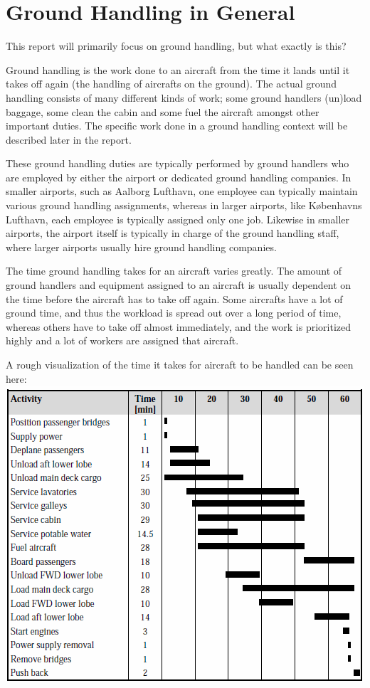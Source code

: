 \section{Ground Handling in General}
This report will primarily focus on ground handling, but what exactly is this?

Ground handling is the work done to an aircraft from the time it lands until it takes off again (the handling of aircrafts on the ground). The actual ground handling consists of many different kinds of work; some ground handlers (un)load baggage, some clean the cabin and some fuel the aircraft amongst other important duties. The specific work done in a ground handling context will be described later in the report.

These ground handling duties are typically performed by ground handlers who are employed by either the airport or dedicated ground handling companies. In smaller airports, such as Aalborg Lufthavn, one employee can typically maintain various ground handling assignments, whereas in larger airports, like Københavns Lufthavn, each employee is typically assigned only one job. Likewise in smaller airports, the airport itself is typically in charge of the ground handling staff, where larger airports usually hire ground handling companies.

The time ground handling takes for an aircraft varies greatly. The amount of ground handlers and equipment assigned to an aircraft is usually dependent on the time before the aircraft has to take off again. Some aircrafts have a lot of ground time, and thus the workload is spread out over a long period of time, whereas others have to take off almost immediately, and the work is prioritized highly and a lot of workers are assigned that aircraft.


A rough visualization of the time it takes for aircraft to be handled can be seen here:
\includegraphics[width = \textwidth]{Grafik/timetable.png}